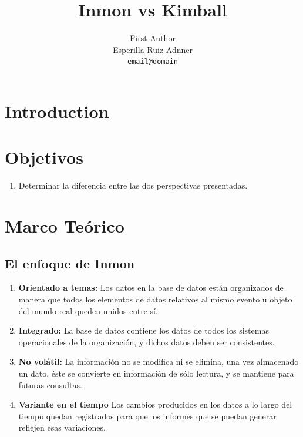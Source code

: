 \documentclass[11pt]{article}
\title{Inmon vs Kimball}
\author{First Author \\
Esperilla Ruiz Adnner \\
  {\tt email@domain} \\}
\date{}
\begin{document}
\maketitle
\begin{abstract}
    
\end{abstract}


\section{Introduction}


\section{Objetivos}
\begin{enumerate}
    \item Determinar la diferencia entre las dos perspectivas presentadas.
\end{enumerate}


\section{Marco Teórico}

\subsection{El enfoque de Inmon}

\begin{enumerate}
    \item \textbf{Orientado a temas:} Los datos en la base de datos están organizados de manera que todos los elementos de datos relativos al mismo evento u objeto del mundo real queden unidos entre sí.
    \item \textbf{Integrado:} La base de datos contiene los datos de todos los sistemas operacionales de la organización, y dichos datos deben ser consistentes. 
\item \textbf{No volátil:} La información no se modifica ni se elimina, una vez almacenado un dato, éste se convierte en información de sólo lectura, y se mantiene para futuras consultas.

\item \textbf{Variante en el tiempo} Los cambios producidos en los datos a lo largo del tiempo quedan registrados para que los informes que se puedan generar reflejen esas variaciones.

\end{enumerate}
\end{document}
